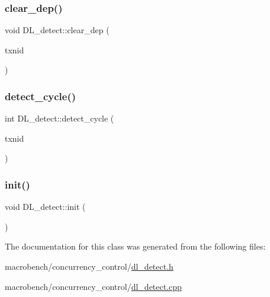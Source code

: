 \mbox{\label{classDL__detect_ae24a28ca113a308b617bcd15180ad122}} 
\subsubsection{\texorpdfstring{clear\+\_\+dep()}{clear\_dep()}}
{\footnotesize\ttfamily void D\+L\+\_\+detect\+::clear\+\_\+dep (\begin{DoxyParamCaption}\item[{uint64\+\_\+t}]{txnid }\end{DoxyParamCaption})}

\mbox{\label{classDL__detect_af6ce866812b9b2b1717e9248c5bb24ed}} 
\subsubsection{\texorpdfstring{detect\+\_\+cycle()}{detect\_cycle()}}
{\footnotesize\ttfamily int D\+L\+\_\+detect\+::detect\+\_\+cycle (\begin{DoxyParamCaption}\item[{uint64\+\_\+t}]{txnid }\end{DoxyParamCaption})}

\mbox{\label{classDL__detect_a3fcb32ea28c2e74ac8084b2c38cc3a47}} 
\subsubsection{\texorpdfstring{init()}{init()}}
{\footnotesize\ttfamily void D\+L\+\_\+detect\+::init (\begin{DoxyParamCaption}{ }\end{DoxyParamCaption})}



The documentation for this class was generated from the following files\+:\begin{DoxyCompactItemize}
\item 
macrobench/concurrency\+\_\+control/\hyperlink{dl__detect_8h}{dl\+\_\+detect.\+h}\item 
macrobench/concurrency\+\_\+control/\hyperlink{dl__detect_8cpp}{dl\+\_\+detect.\+cpp}\end{DoxyCompactItemize}
